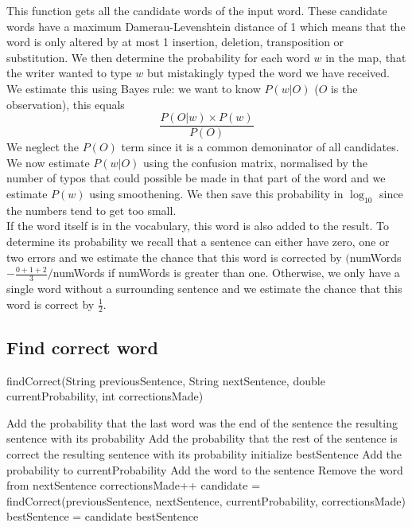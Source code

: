 \documentclass[a4paper,twoside,11pt]{article}
\begin{document}
This function gets all the candidate words of the input word. These candidate words have a maximum Damerau-Levenshtein distance of 1 which means that the word is only altered by at most 1 insertion, deletion, transposition or substitution. 
We then determine the probability for each word $w$ in the map, that the writer wanted to type $w$ but mistakingly typed the word we have received. We estimate this using Bayes rule: we want to know $P(w|O)$ ($O$ is the observation), this equals
$$
	\frac{P(O|w)\times P(w)}{P(O)}
$$
We neglect the $P(O)$ term since it is a common demoninator of all candidates. We now estimate $P(w|O)$ using the confusion matrix, normalised by the number of typos that could possible be made in that part of the word and we estimate $P(w)$ using smoothening.
 We then save this probability in $\log_{10}$ since the numbers tend to get too small.\\
If the word itself is in the vocabulary, this word is also added to the result. To determine its probability we recall that a sentence can either have zero, one or two errors and we estimate the chance that this word is corrected by $($numWords $-\frac{0+1+2}{3}/$numWords if numWords is greater than one. Otherwise, we only have a single word without a surrounding sentence and we estimate the chance that this word is correct by $\frac{1}{2}$. 

\subsection{Find correct word}
\begin{algorithm}[H]
\caption{findCorrect(String previousSentence, String nextSentence, double currentProbability, int correctionsMade)}
\begin{algorithmic}
\State Add the probability that the last word was the end of the sentence 
\State \Return the resulting sentence with its probability 
\State Add the probability that the rest of the sentence is correct
\State \Return the resulting sentence with its probability
\Else
\State initialize bestSentence
\State Add the probability to currentProbability
\State Add the word to the sentence
\State Remove the word from nextSentence
\State correctionsMade++
\EndIf
\State candidate = findCorrect(previousSentence, nextSentence, currentProbability, correctionsMade)
\State bestSentence = candidate
\EndIf
\EndFor
\State \Return bestSentence
\EndIf
\end{algorithmic}
\end{algorithm}
\end{document}
